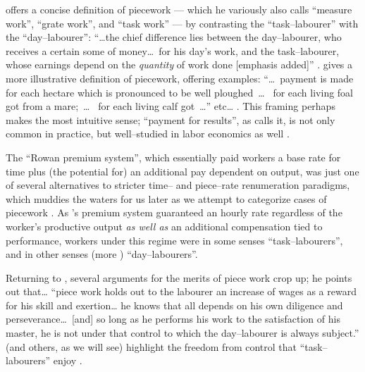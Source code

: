 \documentclass[trackingWork]{subfiles}
\begin{document}
\citeauthor{hughRaynbirdTaskWork} offers
a concise definition of piecework
--- which he variously also calls ``measure work'', ``grate work'', and ``task work'' ---
by contrasting the ``task--labourer'' with the ``day--labourer'':
``\dots the chief difference lies between the day--labourer,
who receives a certain some of money\dots~for his day's work,
and the task--labourer, whose earnings depend on the \textit{quantity} of work done [emphasis added]''
\cite{hughRaynbirdTaskWork}.
\citeauthor{10.2307/2338394} gives a more illustrative definition of piecework,
offering examples:
``\dots~payment is made for each hectare which is pronounced to be well ploughed~\dots~
for each living foal got from a mare;~\dots~
for each living calf got~\dots'' etc\dots
\cite{10.2307/2338394}.
This framing perhaps makes the most intuitive sense;
``payment for results'', as \citeauthor{10.2307/2338394} calls it,
is not only common in practice, but well--studied in labor economics as well
\cite{Figlio2007901,weitzman1976new,10.2307/3003414,BJIR:BJIR038}.

The ``Rowan premium system'',
which essentially paid workers
a base rate for time plus
(the potential for) an additional pay dependent on output,
was just one of several alternatives to stricter time-- and piece--rate renumeration paradigms, which
muddies the waters for us later as we attempt to categorize cases of piecework
\cite{rowan1901premium}.
As \citeauthor{rowan1901premium}'s premium system guaranteed an hourly rate
regardless of the worker's productive output
\textit{as well as} an additional compensation tied to performance,
workers under this regime were in some senses ``task--labourers'',
and in other senses
(more )
``day--labourers''.

Returning to
\citeauthor{hughRaynbirdTaskWork}, several arguments for the merits of piece work%
crop up; he points out that\dots
``piece work holds out to the labourer an increase of wages as a reward for his skill and exertion\dots
he knows that all depends on his own diligence and perseverance\dots~[and]
so long as he performs his work to the satisfaction of his master,
he is not under that control to which the day--labourer is always subject.''
\citeauthor{hughRaynbirdTaskWork} (and others, as we will see)
highlight the freedom from control that ``task--labourers'' enjoy
\cite{hughRaynbirdTaskWork,rowan1901premium}.
\end{document}
